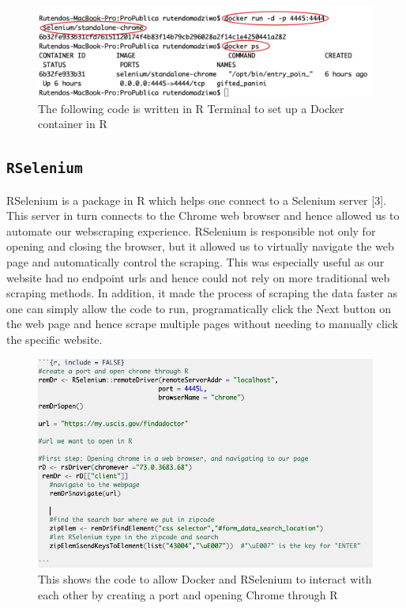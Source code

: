 \documentclass[10pt,letterpaper]{article}
\begin{document}
\begin{figure}
\includegraphics[width=1\linewidth]{docker_start} \caption{The following code is written in R Terminal to set up a Docker container in R}\label{fig:unnamed-chunk-2}
\end{figure}

\hypertarget{rselenium}{%
\subsection{\texorpdfstring{\texttt{RSelenium}}{RSelenium}}\label{rselenium}}

RSelenium is a package in R which helps one connect to a Selenium server
{[}3{]}. This server in turn connects to the Chrome web browser and
hence allowed us to automate our webscraping experience. RSelenium is
responsible not only for opening and closing the browser, but it allowed
us to virtually navigate the web page and automatically control the
scraping. This was especially useful as our website had no endpoint urls
and hence could not rely on more traditional web scraping methods. In
addition, it made the process of scraping the data faster as one can
simply allow the code to run, programatically click the Next button on
the web page and hence scrape multiple pages without needing to manually
click the specific website.

\begin{figure}
\includegraphics[width=1\linewidth]{docker_selenium} \caption{This shows the code to allow Docker and RSelenium to interact with each other by creating a port and opening Chrome through R}\label{fig:unnamed-chunk-3}
\end{figure}
\end{document}
